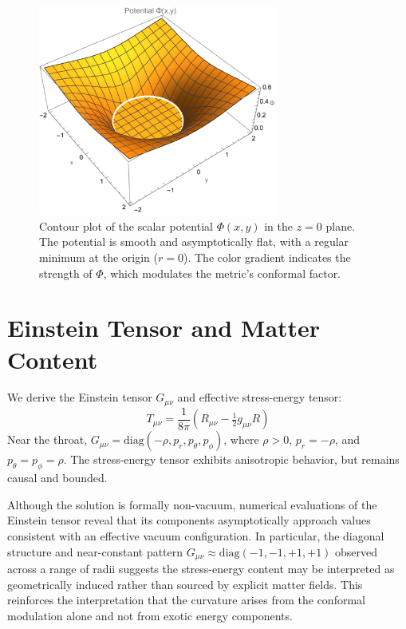 \documentclass[12pt]{article}
\begin{document}
\begin{figure}[htbp]
    \centering
    \includegraphics[width=0.7\textwidth]{FlatVisual.png}
    \caption{Contour plot of the scalar potential \( \Phi(x, y) \) in the \( z = 0 \) plane. The potential is smooth and asymptotically flat, with a regular minimum at the origin (\( r = 0 \)). The color gradient indicates the strength of \( \Phi \), which modulates the metric's conformal factor.}
    \label{fig:potential}
\end{figure}

\section{Einstein Tensor and Matter Content}
We derive the Einstein tensor \( G_{\mu\nu} \) and effective stress-energy tensor:
\[
T_{\mu\nu} = \frac{1}{8\pi}(R_{\mu\nu} - \tfrac{1}{2}g_{\mu\nu}R)
\]
Near the throat, \( G_{\mu\nu} = \mathrm{diag}(-\rho, p_r, p_\theta, p_\phi) \), where \( \rho > 0 \), \( p_r = -\rho \), and \( p_\theta = p_\phi = \rho \). The stress-energy tensor exhibits anisotropic behavior, but remains causal and bounded.

\vspace{1em}
Although the solution is formally non-vacuum, numerical evaluations of the Einstein tensor reveal that its components asymptotically approach values consistent with an effective vacuum configuration. In particular, the diagonal structure and near-constant pattern \( G_{\mu\nu} \approx \mathrm{diag}(-1, -1, +1, +1) \) observed across a range of radii suggests the stress-energy content may be interpreted as geometrically induced rather than sourced by explicit matter fields. This reinforces the interpretation that the curvature arises from the conformal modulation alone and not from exotic energy components.
\end{document}
